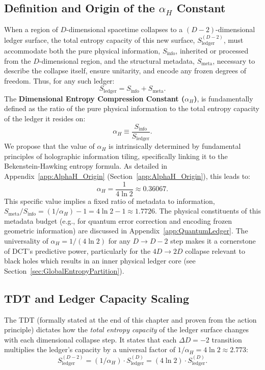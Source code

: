 \documentclass[a4paper, 12pt, oneside]{book}
\numberwithin{equation}{chapter}
\begin{document}
\subsection[Definition and Origin of \texorpdfstring{$\alpha_H$}{alphaH}]{Definition and Origin of the \texorpdfstring{$\alpha_H$}{alphaH} Constant}
\label{sec:AlphaH_Def_Origin}

When a region of $D$-dimensional spacetime collapses to a $(D-2)$-dimensional ledger surface, the total entropy capacity of this new surface, $S_{\text{ledger}}^{(D-2)}$, must accommodate both the pure physical information, $S_{\text{info}}$, inherited or processed from the $D$-dimensional region, and the structural metadata, $S_{\text{meta}}$, necessary to describe the collapse itself, ensure unitarity, and encode any frozen degrees of freedom. Thus, for any such ledger:
\[
    S_{\text{ledger}} = S_{\text{info}} + S_{\text{meta}}.
\]
The \textbf{Dimensional Entropy Compression Constant ($\alpha_H$)}, is fundamentally defined as the ratio of the pure physical information to the total entropy capacity of the ledger it resides on:
\[
    \alpha_H \equiv \frac{S_{\text{info}}}{S_{\text{ledger}}}.
    \label{eq:alphaHDef} %
\]
We propose that the value of $\alpha_H$ is intrinsically determined by fundamental principles of holographic information tiling, specifically linking it to the Bekenstein-Hawking entropy formula. As detailed in Appendix~\ref{app:AlphaH_Origin} (Section~\ref{app:AlphaH_Origin}), this leads to:
\[
    \boxed{\alpha_H = \frac{1}{4 \ln 2} \approx 0.36067}.
    \label{eq:alphaHvalue_Fundamental} %
\]
This specific value implies a fixed ratio of metadata to information, $S_{\text{meta}}/S_{\text{info}} = (1/\alpha_H) - 1 = 4\ln 2 - 1 \approx 1.7726$. The physical constituents of this metadata budget (e.g., for quantum error correction and encoding frozen geometric information) are discussed in Appendix~\ref{app:QuantumLedger}. The universality of $\alpha_H = 1/(4\ln 2)$ for any $D \to D-2$ step makes it a cornerstone of DCT's predictive power, particularly for the $4D \to 2D$ collapse relevant to black holes which results in an inner physical ledger core (see Section~\ref{sec:GlobalEntropyPartition}).

\subsection{TDT and Ledger Capacity Scaling}

The TDT (formally stated at the end of this chapter and proven from the action principle) dictates how the \emph{total entropy capacity} of the ledger surface changes with each dimensional collapse step. It states that each $\Delta D = -2$ transition multiplies the ledger's capacity by a universal factor of \(1/\alpha_H = 4\ln 2 \approx 2.773\):
\[
    S_{\text{ledger}}^{(D-2)} = (1/\alpha_H) \cdot S_{\text{ledger}}^{(D)} = (4\ln 2) \cdot S_{\text{ledger}}^{(D)}.
    \label{eq:TDTledgerScaling}
\]
\end{document}
